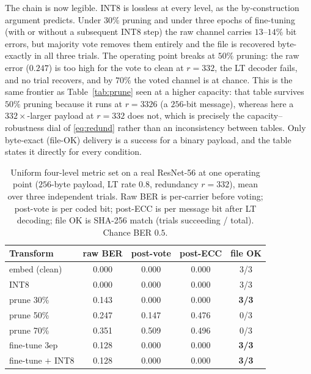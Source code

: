\documentclass[a4paper,fleqn]{cas-dc}
\theoremstyle{plain}
\theoremstyle{remark}
\begin{document}
The chain is now legible. INT8 is lossless at every level, as the by-construction argument
predicts. Under $30\%$ pruning and under three epochs of fine-tuning (with or without a
subsequent INT8 step) the raw channel carries $13$--$14\%$ bit errors, but majority vote
removes them entirely and the file is recovered byte-exactly in all three trials. The
operating point breaks at $50\%$ pruning: the raw error ($0.247$) is too high for the vote to
clean at $r{=}332$, the LT decoder fails, and no trial recovers, and by $70\%$ the voted
channel is at chance. This is the same frontier as Table~\ref{tab:prune} seen at a higher
capacity: that table survives $50\%$ pruning because it runs at $r{=}3326$ (a $256$-bit
message), whereas here a $332\times$-larger payload at $r{=}332$ does not, which is precisely
the capacity--robustness dial of \eqref{eq:redund} rather than an inconsistency between
tables. Only byte-exact (file-OK) delivery is a success for a binary payload, and the table
states it directly for every condition.

\begin{table}[!tb]\centering
\caption{Uniform four-level metric set on a real ResNet-56 at one operating point
($256$-byte payload, LT rate $0.8$, redundancy $r{=}332$), mean over three independent
trials. Raw BER is per-carrier before voting; post-vote is per coded bit; post-ECC is per
message bit after LT decoding; file OK is SHA-256 match (trials succeeding / total).
Chance BER $0.5$.}
\label{tab:uniform}
\begin{tabular*}{\columnwidth}{@{\extracolsep{\fill}}lcccc@{}}
\toprule
Transform & raw BER & post-vote & post-ECC & file OK\\
\midrule
embed (clean) & 0.000 & 0.000 & 0.000 & 3/3\\
INT8 & 0.000 & 0.000 & 0.000 & 3/3\\
prune 30\% & 0.143 & 0.000 & 0.000 & \textbf{3/3}\\
prune 50\% & 0.247 & 0.147 & 0.476 & 0/3\\
prune 70\% & 0.351 & 0.509 & 0.496 & 0/3\\
fine-tune 3ep & 0.128 & 0.000 & 0.000 & \textbf{3/3}\\
fine-tune $+$ INT8 & 0.128 & 0.000 & 0.000 & \textbf{3/3}\\
\bottomrule
\end{tabular*}
\end{table}
\end{document}

